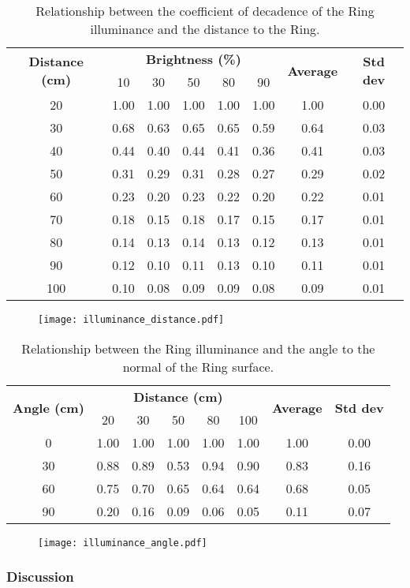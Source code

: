 \begin{table}[h!]
	\centering
	\caption{Relationship between the coefficient of decadence of the Ring illuminance and the distance to the Ring.}
	\label{table:illuminance_distance}
	\begin{tabular}{cccccccc}
		\hline
		\hline
		\toprule
		\multirow{2}{*}{\textbf{Distance (cm)}} & \multicolumn{5}{c}{\textbf{Brightness (\%)}} & \multirow{2}{*}{\textbf{Average}} & \multirow{2}{*}{\textbf{Std dev}}\\
		& 10 & 30 & 50 & 80 & 90 &&\\
		\bottomrule
		\toprule
		20	&	1.00	&	1.00	&	1.00	&	1.00	&	1.00	&	1.00	&	0.00	\\
		30	&	0.68	&	0.63	&	0.65	&	0.65	&	0.59	&	0.64	&	0.03	\\
		40	&	0.44	&	0.40	&	0.44	&	0.41	&	0.36	&	0.41	&	0.03	\\
		50	&	0.31	&	0.29	&	0.31	&	0.28	&	0.27	&	0.29	&	0.02	\\
		60	&	0.23	&	0.20	&	0.23	&	0.22	&	0.20	&	0.22	&	0.01	\\
		70	&	0.18	&	0.15	&	0.18	&	0.17	&	0.15	&	0.17	&	0.01	\\
		80	&	0.14	&	0.13	&	0.14	&	0.13	&	0.12	&	0.13	&	0.01	\\
		90	&	0.12	&	0.10	&	0.11	&	0.13	&	0.10	&	0.11	&	0.01	\\
		100	&	0.10	&	0.08	&	0.09	&	0.09	&	0.08	&	0.09	&	0.01	\\
		\bottomrule
		\hline
		\hline
	\end{tabular}
\end{table}
\begin{figure}[ht]
	\centering
	\texttt{[image: illuminance\_distance.pdf]}
	\caption{}
	\label{fig:illuminance_distance}
\end{figure}

\begin{table}[h!]
	\centering
	\caption{Relationship between the Ring illuminance and the angle to the normal of the Ring surface.}
	\label{table:illuminance_angle}
	\begin{tabular}{cccccccc}
		\hline
		\hline
		\toprule
		\multirow{2}{*}{\textbf{Angle (cm)}} & \multicolumn{5}{c}{\textbf{Distance (cm)}} & \multirow{2}{*}{\textbf{Average}} & \multirow{2}{*}{\textbf{Std dev}}\\
		& 20 & 30 & 50 & 80 & 100 &&\\
		\bottomrule
		\toprule
		0	&	1.00	&	1.00	&	1.00	&	1.00	&	1.00	&	1.00	&	0.00	\\
		30	&	0.88	&	0.89	&	0.53	&	0.94	&	0.90	&	0.83	&	0.16	\\
		60	&	0.75	&	0.70	&	0.65	&	0.64	&	0.64	&	0.68	&	0.05	\\
		90	&	0.20	&	0.16	&	0.09	&	0.06	&	0.05	&	0.11	&	0.07	\\
		\bottomrule
		\hline
		\hline
	\end{tabular}
\end{table}
\begin{figure}[ht]
	\centering
	\texttt{[image: illuminance\_angle.pdf]}
	\caption{}
	\label{fig:illuminance_angle}
\end{figure}


\subsubsection{Discussion}
